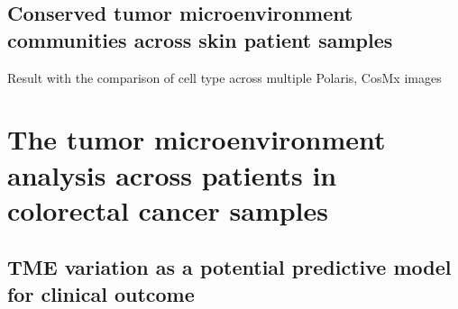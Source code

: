 \subsection{Conserved tumor microenvironment communities across skin patient samples}
Result with the comparison of cell type across multiple Polaris, CosMx images 

\section{The tumor microenvironment analysis across patients in colorectal cancer samples}
\subsection{TME variation as a potential predictive model for clinical outcome}





% 

% 